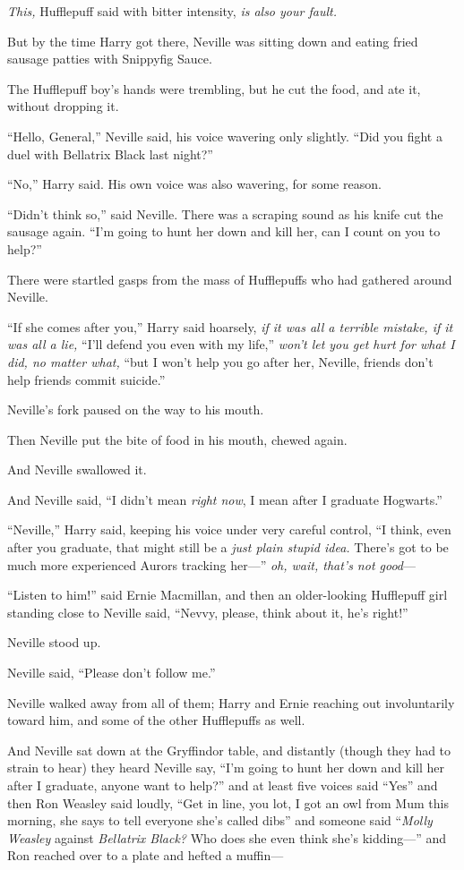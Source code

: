 \emph{This,} Hufflepuff said with bitter intensity, \emph{is also your fault.}

But by the time Harry got there, Neville was sitting down and eating fried sausage patties with Snippyfig Sauce.

The Hufflepuff boy’s hands were trembling, but he cut the food, and ate it, without dropping it.

“Hello, General,” Neville said, his voice wavering only slightly. “Did you fight a duel with Bellatrix Black last night?”

“No,” Harry said. His own voice was also wavering, for some reason.

“Didn’t think so,” said Neville. There was a scraping sound as his knife cut the sausage again. “I’m going to hunt her down and kill her, can I count on you to help?”

There were startled gasps from the mass of Hufflepuffs who had gathered around Neville.

“If she comes after you,” Harry said hoarsely, \emph{if it was all a terrible mistake, if it was all a lie,} “I’ll defend you even with my life,” \emph{won’t let you get hurt for what I did, no matter what,} “but I won’t help you go after her, Neville, friends don’t help friends commit suicide.”

Neville’s fork paused on the way to his mouth.

Then Neville put the bite of food in his mouth, chewed again.

And Neville swallowed it.

And Neville said, “I didn’t mean \emph{right now}, I mean after I graduate Hogwarts.”

“Neville,” Harry said, keeping his voice under very careful control, “I think, even after you graduate, that might still be a \emph{just plain stupid idea.} There’s got to be much more experienced Aurors tracking her—” \emph{oh, wait, that’s not good}—

“Listen to him!” said Ernie Macmillan, and then an older-looking Hufflepuff girl standing close to Neville said, “Nevvy, please, think about it, he’s right!”

Neville stood up.

Neville said, “Please don’t follow me.”

Neville walked away from all of them; Harry and Ernie reaching out involuntarily toward him, and some of the other Hufflepuffs as well.

And Neville sat down at the Gryffindor table, and distantly (though they had to strain to hear) they heard Neville say, “I’m going to hunt her down and kill her after I graduate, anyone want to help?” and at least five voices said “Yes” and then Ron Weasley said loudly, “Get in line, you lot, I got an owl from Mum this morning, she says to tell everyone she’s called dibs” and someone said “\emph{Molly Weasley} against \emph{Bellatrix Black?} Who does she even think she’s kidding—” and Ron reached over to a plate and hefted a muffin—

